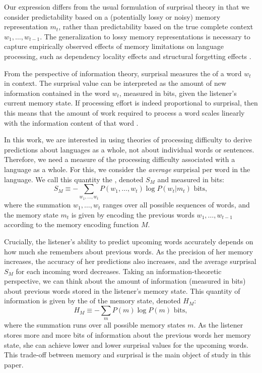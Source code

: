 Our expression differs from the usual formulation of surprisal theory in that we consider predictability based on a (potentially lossy or noisy) memory representation $m_t$, rather than predictability based on the true complete context $w_1, \dots, w_{t-1}$. The generalization to lossy memory representations is necessary to capture empirically observed effects of memory limitations on language processing, such as dependency locality effects and structural forgetting effects \citep{futrell-noisy-context-2017,futrell2019information}.

From the perspective of information theory, surprisal measures the  of a word $w_t$ in context. The surprisal value can be interpreted as the amount of new information contained in the word $w_t$, measured in bits, given the listener's current memory state. If processing effort is indeed proportional to surprisal, then this means that the amount of work required to process a word scales linearly with the information content of that word \citep[reflecting a general bound on the cost of computation in physical systems;][]{landau,information-engines}. 

In this work, we are interested in using theories of processing difficulty to derive predictions about languages as a whole, not about individual words or sentences. Therefore, we need a measure of the processing difficulty associated with a language as a whole. For this, we consider the \emph{average} surprisal per word in the language. We call this quantity the , denoted $S_M$ and measured in bits: 
\begin{equation}
    \label{eq:avg-surp}
    S_M \equiv -\sum_{w_1, \dots, w_t} P(w_1, \dots, w_t) \log P(w_t | m_t) \text{ bits},
\end{equation}
where the summation $w_1, \dots, w_t$ ranges over all possible sequences of words, and the memory state $m_t$ is given by encoding the previous words $w_1, \dots, w_{t-1}$ according to the memory encoding function $M$. 

Crucially, the listener's ability to predict upcoming words accurately depends on how much she remembers about previous words. As the precision of her memory increases, the accuracy of her predictions also increases, and the average surprisal $S_M$ for each incoming word decreases. Taking an information-theoretic perspective, we can think about the amount of information (measured in bits) about previous words stored in the listener's memory state. This quantity of information is given by the  of the memory state, denoted $H_M$:
\begin{equation}
    H_M \equiv - \sum_m P(m) \log P(m) \text{ bits},
\end{equation}
where the summation runs over all possible memory states $m$. As the listener stores more and more bits of information about the previous words her memory state, she can achieve lower and lower surprisal values for the upcoming words. This trade-off between memory and surprisal is the main object of study in this paper.

